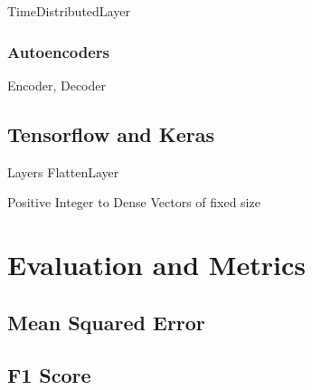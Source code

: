 TimeDistributedLayer

\subsubsection{Autoencoders}

Encoder, Decoder

\subsection{Tensorflow and Keras}
Layers
FlattenLayer

Positive Integer to Dense Vectors of fixed size

\section{Evaluation and Metrics}
\subsection{Mean Squared Error}
\subsection{F1 Score}
